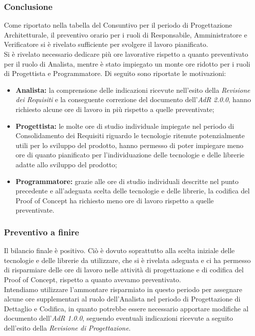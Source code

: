 \subsubsection{Conclusione}
Come riportato nella tabella del Consuntivo per il periodo di Progettazione Architetturale, il preventivo orario per i ruoli di Responsabile, Amministratore e Verificatore si è rivelato sufficiente per svolgere il lavoro pianificato. \\
Si è rivelato necessario dedicare più ore lavorative rispetto a quanto preventivato per il ruolo di Analista, mentre è stato impiegato un monte ore ridotto per i ruoli di Progettista e Programmatore. Di seguito sono riportate le motivazioni:
\begin{itemize}
	\item \textbf{Analista:} la comprensione delle indicazioni ricevute nell'esito della \textit{Revisione dei Requisiti} e la conseguente correzione del documento dell'\textit{AdR{} 2.0.0}, hanno richiesto alcune ore di lavoro in più rispetto a quelle preventivate;
	\item \textbf{Progettista:} le molte ore di studio individuale impiegate nel periodo di Consolidamento dei Requisiti riguardo le tecnologie ritenute potenzialmente utili per lo sviluppo del prodotto, hanno permesso di poter impiegare meno ore di quanto pianificato per l'individuazione delle tecnologie e delle librerie adatte allo sviluppo del prodotto;
	\item \textbf{Programmatore:} grazie alle ore di studio individuali descritte nel punto precedente e all'adeguata scelta delle tecnologie e delle librerie, la codifica del Proof of Concept ha richiesto meno ore di lavoro rispetto a quelle preventivate.
\end{itemize}
\subsubsection{Preventivo a finire}
Il bilancio finale è positivo. Ciò è dovuto soprattutto alla scelta iniziale delle tecnologie e delle librerie da utilizzare, che si è rivelata adeguata e ci ha permesso di risparmiare delle ore di lavoro nelle attività di progettazione e di codifica del Proof of Concept, rispetto a quanto avevamo preventivato. \\
Intendiamo utilizzare l'ammontare risparmiato in questo periodo per assegnare alcune ore supplementari al ruolo dell'Analista nel periodo di Progettazione di Dettaglio e Codifica, in quanto potrebbe essere necessario apportare modifiche al documento dell'\textit{AdR{} 1.0.0}, seguendo eventuali indicazioni ricevute a seguito dell'esito della \textit{Revisione di Progettazione}.


